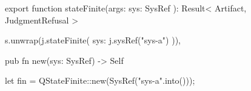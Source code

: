 \begin{tssrc}
export function stateFinite(args: { sys: SysRef }): Result<
  Artifact,
  JudgmentRefusal
>
\end{tssrc}
\begin{tssrc}
s.unwrap(j.stateFinite({ sys: j.sysRef("sys-a") })),
\end{tssrc}
\begin{rustsrc}
pub fn new(sys: SysRef) -> Self
\end{rustsrc}
\begin{rustsrc}
let fin = QStateFinite::new(SysRef("sys-a".into()));
\end{rustsrc}
